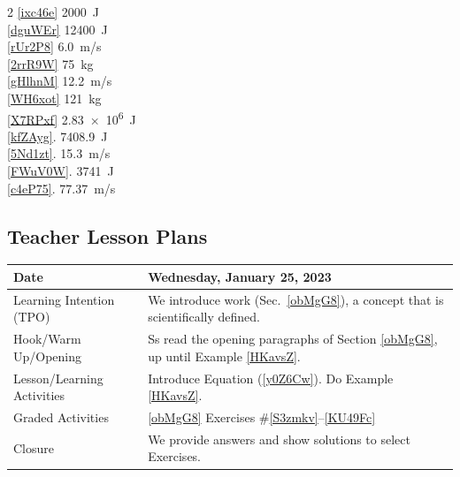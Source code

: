 \documentclass{article}
\numberwithin{equation}{section}
\numberwithin{figure}{section}
\begin{document}
\begin{multicols}{2}
\ref{ixc46e} \SI{2000}{J}\\
\ref{dguWEr} \SI{12400}{J}\\
\ref{rUr2P8} \SI{6.0}{m/s}\\
\ref{2rrR9W} \SI{75}{kg}\\
\ref{gHlhnM} \SI{12.2}{m/s}\\
\ref{WH6xot} \SI{121}{kg}\\
\ref{X7RPxf} \SI{2.83e6}{J}\\
\ref{kfZAyg}. \SI{7408.9}{J}\\
\ref{5Nd1zt}. \SI{15.3}{m/s}\\
\ref{FWuV0W}. \SI{3741}{J}\\
\ref{c4eP75}. \SI{77.37}{m/s}\\
\end{multicols}




\clearpage
\subsection{Teacher Lesson Plans}

\begin{tabular}{|m{}|m{}|}
    \hline  
    \cellcolor{black!20}\textbf{Date} &
    \cellcolor{black!20}\textbf{Wednesday, January 25, 2023} \\
    \hline
    Learning Intention (TPO) & We introduce \gls{work} (Sec.~\ref{obMgG8}), a concept that is scientifically defined.\\
    \hline
    Hook/Warm Up/Opening & Ss read the opening paragraphs of Section \ref{obMgG8}, up until Example \ref{HKavsZ}.\\
    \hline
    Lesson/Learning Activities &  Introduce Equation (\ref{y0Z6Cw}). Do Example \ref{HKavsZ}.  \\
    \hline
    Graded Activities & \ref{obMgG8} Exercises \#\ref{S3zmkv}--\ref{KU49Fc} \\
    \hline
    Closure & We provide answers and show solutions to select Exercises.\\   
    \hline
\end{tabular}
\end{document}
